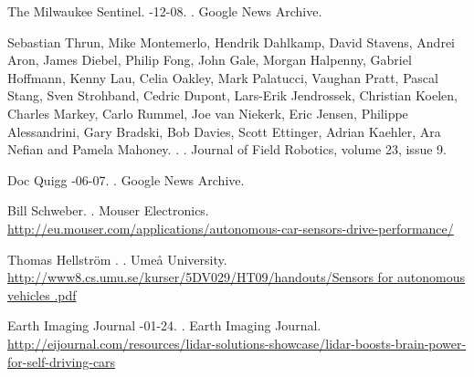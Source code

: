 \begin{thebibliography}{}

The Milwaukee Sentinel.
-12-08.
.
\newblock Google News Archive.

Sebastian Thrun, Mike Montemerlo, Hendrik Dahlkamp, David Stavens, Andrei Aron, James Diebel, Philip Fong, John Gale, Morgan Halpenny, Gabriel Hoffmann, Kenny Lau, Celia Oakley, Mark Palatucci, Vaughan Pratt, Pascal Stang, Sven Strohband, Cedric Dupont, Lars-Erik Jendrossek, Christian Koelen, Charles Markey, Carlo Rummel, Joe van Niekerk, Eric Jensen, Philippe Alessandrini, Gary Bradski, Bob Davies, Scott Ettinger, Adrian Kaehler, Ara Nefian and Pamela Mahoney.
.
.
\newblock Journal of Field Robotics, volume 23, issue 9.

Doc Quigg
-06-07.
.
\newblock Google News Archive.

Bill Schweber.
.
\newblock Mouser Electronics.
\newblock \href{http://eu.mouser.com/applications/autonomous-car-sensors-drive-performance/}{http://eu.mouser.com/applications/autonomous-car-sensors-drive-performance/}

Thomas Hellstr\"{o}m
.
.
\newblock Ume{\aa} University.
\newblock
\href{http://www8.cs.umu.se/kurser/5DV029/HT09/handouts/Sensors for autonomous vehicles .pdf}{http://www8.cs.umu.se/kurser/5DV029/HT09/handouts/Sensors for autonomous vehicles .pdf}

Earth Imaging Journal
-01-24.
.
\newblock Earth Imaging Journal.
\newblock
\href{http://eijournal.com/resources/lidar-solutions-showcase/lidar-boosts-brain-power-for-self-driving-cars}{http://eijournal.com/resources/lidar-solutions-showcase/lidar-boosts-brain-power-for-self-driving-cars}



\end{thebibliography}
